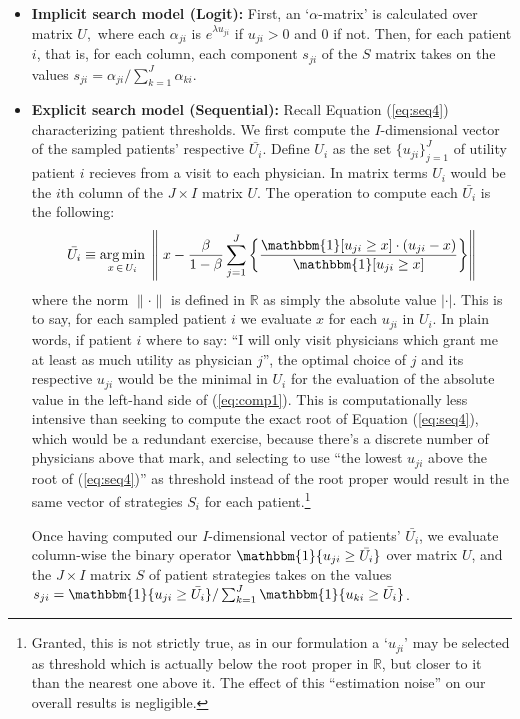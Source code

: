 \documentclass[../main.tex]{subfiles}
\begin{document}
\begin{itemize}[itemsep=4pt, topsep=0pt]
    \item \textbf{Implicit search model (Logit):} First, an `$\alpha$-matrix' is calculated over matrix $U,$ where each $\alpha_{ji}$ is $e^{\lambda u_{ji}}$ if $u_{ji} > 0$ and $0$ if not. Then, for each patient $i$, that is, for each column, each component $s_{ji}$ of the $S$ matrix takes on the values $s_{ji} = \alpha_{ji}/\sum_{k = 1}^{J} \alpha_{ki}$.

    \item \textbf{Explicit search model (Sequential):} Recall Equation (\ref{eq:seq4}) characterizing patient thresholds. We first compute the $I$-dimensional vector of the sampled patients' respective $\bar{U_i}$. Define $U_i$ as the set $\{u_{ji}\}_{j=1}^{J}$ of utility patient $i$ recieves from a visit to each physician. In matrix terms $U_i$ would be the $i$th column of the $J \times I$ matrix $U$. The operation to compute each $\bar{U_i}$ is the following: \vspace{-0.5em}
    \begin{equation*}
    \bar{U_i} \equiv \argmin_{x \, \in \, U_i}\; \left\|  \; x - \frac{\beta}{1-\beta}  \sum_{j=1}^{J} \left\{ \frac{\mathbbm{1}[ u_{ji} \geq x ] \cdot (u_{ji} - x)}{\mathbbm{1}[ u_{ji} \geq x ]} \right\} \right\|
    \label{eq:comp1}
    \end{equation*}
    where the norm $\| \cdot \|$ is defined in $\mathbb{R}$ as simply the absolute value $| \cdot |$. This is to say, for each sampled patient $i$ we evaluate $x$ for each $u_{ji}$ in $U_i$. In plain words, if patient $i$ where to say: ``I will only visit physicians which grant me at least as much utility as physician $j$'', the optimal choice of $j$ and its respective $u_{ji}$ would be the minimal in $U_i$ for the evaluation of the absolute value in the left-hand side of (\ref{eq:comp1}). This is computationally less intensive than seeking to compute the exact root of Equation (\ref{eq:seq4}), which would be a redundant exercise, because there's a discrete number of physicians above that mark, and selecting to use ``the lowest $u_{ji}$ above the root of (\ref{eq:seq4})'' as threshold instead of the root proper would result in the same vector of strategies $S_i$ for each patient.\footnote{Granted, this is not strictly true, as in our formulation a `$u_{ji}$' may be selected as threshold which is actually below the root proper in $\mathbb{R}$, but closer to it than the nearest one above it. The effect of this ``estimation noise'' on our overall results is negligible.}

    Once having computed our $I$-dimensional vector of patients' $\bar{U_i}$, we evaluate column-wise the binary operator $\mathbbm{1}\{u_{ji}\geq \bar{U_i}\}$ over matrix $U$, and the $J \times I$ matrix $S$ of patient strategies takes on the values $s_{ji} = \mathbbm{1}\{u_{ji}\geq \bar{U_i}\} / \sum_{k=1}^{J} \mathbbm{1}\{u_{ki}\geq \bar{U_i}\}$.
\end{itemize}
\end{document}
